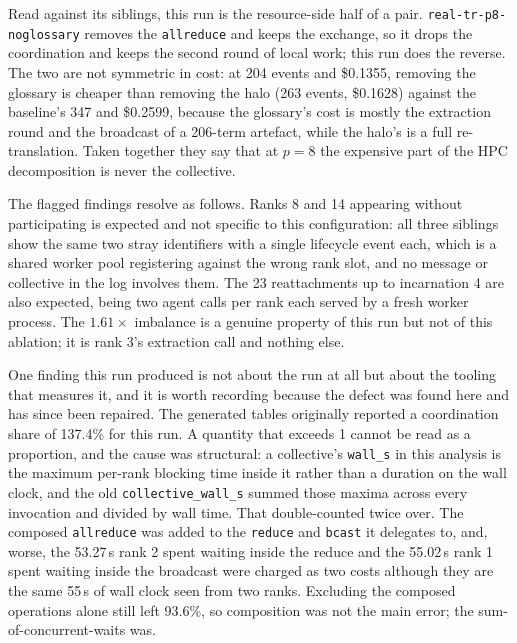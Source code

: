\documentclass[11pt]{article}
\begin{document}
Read against its siblings, this run is the resource-side half of a pair.
\texttt{real-tr-p8-noglossary} removes the \texttt{allreduce} and keeps the exchange, so it drops the
coordination and keeps the second round of local work; this run does the reverse. The two are not
symmetric in cost: at 204 events and \$0.1355, removing the glossary is cheaper than removing the
halo (263 events, \$0.1628) against the baseline's 347 and \$0.2599, because the glossary's cost is
mostly the extraction round and the broadcast of a 206-term artefact, while the halo's is a full
re-translation. Taken together they say that at $p=8$ the expensive part of the HPC decomposition is
never the collective.

The flagged findings resolve as follows. Ranks 8 and 14 appearing without participating is
expected and not specific to this configuration: all three siblings show the same two stray
identifiers with a single lifecycle event each, which is a shared worker pool registering against the
wrong rank slot, and no message or collective in the log involves them. The 23 reattachments up to
incarnation 4 are also expected, being two agent calls per rank each served by a fresh worker
process. The $1.61\times$ imbalance is a genuine property of this run but not of this ablation; it is
rank 3's extraction call and nothing else.

One finding this run produced is not about the run at all but about the tooling that measures it, and
it is worth recording because the defect was found here and has since been repaired. The generated
tables originally reported a coordination share of 137.4\% for this run. A quantity that exceeds 1
cannot be read as a proportion, and the cause was structural: a collective's \texttt{wall\_s} in this
analysis is the maximum per-rank blocking time inside it rather than a duration on the wall clock,
and the old \texttt{collective\_wall\_s} summed those maxima across every invocation and divided by
wall time. That double-counted twice over. The composed \texttt{allreduce} was added to the
\texttt{reduce} and \texttt{bcast} it delegates to, and, worse, the 53.27\,s rank 2 spent waiting
inside the reduce and the 55.02\,s rank 1 spent waiting inside the broadcast were charged as two
costs although they are the same 55\,s of wall clock seen from two ranks. Excluding the composed
operations alone still left 93.6\%, so composition was not the main error; the sum-of-concurrent-waits
was.
\end{document}
